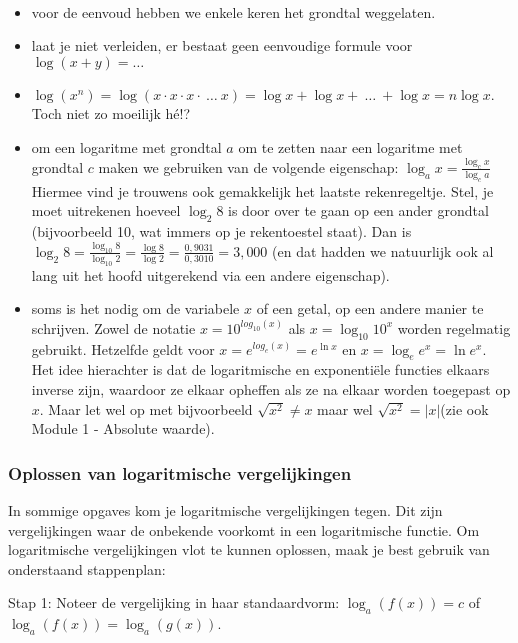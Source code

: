 \begin{opmerking}
	\ \\
\begin{itemize}
\item voor de eenvoud hebben we enkele keren het grondtal weggelaten. 
\item laat je niet verleiden, er bestaat geen eenvoudige formule voor $\log\left(x+y\right)=\ldots$
\item $\log\left(x^{n}\right)=\log\left(x\cdot x\cdot x\cdot \:\ldots\:x\right)=\log x+\log x+\:\ldots\:+\log x=n\log x$.
Toch niet zo moeilijk h\'e!?
\item om een logaritme met grondtal $a$ om te zetten naar een logaritme met
grondtal $c$ maken we gebruiken van de volgende eigenschap: $\log_{a}x=\frac{\log_{c}x}{\log_{c}a}$
Hiermee vind je trouwens ook gemakkelijk het laatste rekenregeltje.
Stel, je moet uitrekenen hoeveel $\log_{2}8$ is door
over te gaan op een ander grondtal (bijvoorbeeld 10, wat immers op
je rekentoestel staat). Dan is $\log_{2}8=\frac{\log_{10}8}{\log_{10}2}=\frac{\log8}{\log2}=\frac{0,9031}{0,3010}=3,000$
(en dat hadden we natuurlijk ook al lang uit het hoofd uitgerekend
via een andere eigenschap).
\item soms is het nodig om de variabele $x$ of een getal, op een andere
manier te schrijven. Zowel de notatie $x=10^{log_{10}(x)}$
als $x=\log_{10}10^{x}$ worden regelmatig gebruikt.
Hetzelfde geldt voor $x=e^{log_{e}(x)}=e^{\ln x}$
en $x=\log_{e}e^{x}=\ln e^{x}$. Het idee hierachter
is dat de logaritmische en exponenti\"ele functies elkaars inverse zijn,
waardoor ze elkaar opheffen als ze na elkaar worden toegepast op $x$.
Maar let wel op met bijvoorbeeld $\sqrt{x^{2}}\neq x$
maar wel $\sqrt{x^{2}}=\left|x\right|$(zie ook Module
1 - Absolute waarde).
\end{itemize}

\end{opmerking}

\subsubsection{Oplossen van logaritmische vergelijkingen}

In sommige opgaves kom je logaritmische vergelijkingen tegen. Dit
zijn vergelijkingen waar de onbekende voorkomt in een logaritmische
functie. Om logaritmische vergelijkingen vlot te kunnen oplossen,
maak je best gebruik van onderstaand stappenplan:

Stap 1: Noteer de vergelijking in haar standaardvorm: $ \log_{a}\left(f(x)\right)=c$
of $ \log_{a}\left(f(x)\right)=\log_{a}\left(g(x)\right)$.

